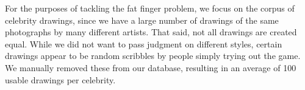 For the purposes of tackling the fat finger problem, we focus on the corpus of celebrity drawings, since we have a large number of drawings of the same photographs by many different artists. That said, not all drawings are created equal. While we did not want to pass judgment on different styles, certain drawings appear to be random scribbles by people simply trying out the game. We manually removed these from our database, resulting in an average of 100 usable drawings per celebrity. 

